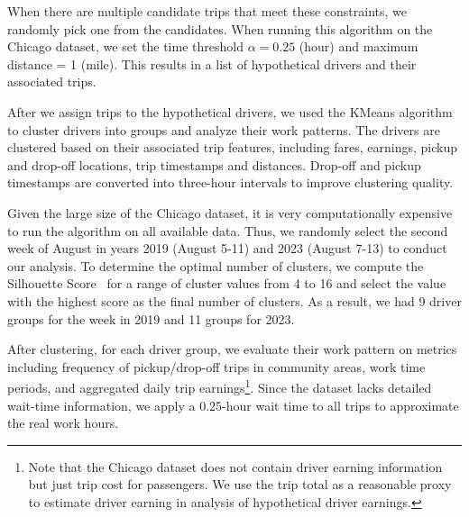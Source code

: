 When there are multiple candidate trips that meet these constraints, we randomly pick one from the candidates. When running this algorithm on the Chicago dataset, we set the time threshold $\alpha = 0.25$ (hour) and maximum distance  = 1 (mile). This results in a list of hypothetical drivers and their associated trips. 

After we assign trips to the hypothetical drivers, we used the KMeans algorithm~\cite{lloyd1982least} to cluster drivers into groups and analyze their work patterns. The drivers are clustered based on their associated trip features, including fares, earnings, pickup and drop-off locations, trip timestamps and distances. Drop-off and pickup timestamps are converted into three-hour intervals to improve clustering quality. 

Given the large size of the Chicago dataset, it is very computationally expensive to run the algorithm on all available data. Thus, we randomly select the second week of August in years 2019 (August 5-11) and 2023 (August 7-13) to conduct our analysis. To determine the optimal number of clusters, we compute the Silhouette Score~\cite{rousseeuw1987silhouettes} for a range of cluster values from 4 to 16 and select the value with the highest score as the final number of clusters. As a result, we had 9 driver groups for the week in 2019 and 11 groups for 2023.

After clustering, for each driver group, we evaluate their work pattern on metrics including frequency of pickup/drop-off trips in community areas, work time periods, and aggregated daily trip earnings\footnote{Note that the Chicago dataset does not contain driver earning information but just trip cost for passengers. We use the trip total as a reasonable proxy to estimate driver earning in analysis of hypothetical driver earnings.}. Since the dataset lacks detailed wait-time information, we apply a 0.25-hour wait time to all trips to approximate the real work hours.











